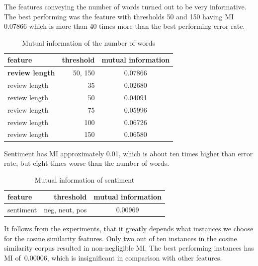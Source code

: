 The features conveying the number of words turned out to be very informative.
The best performing was the feature with thresholds 50 and 150 having MI 0.07866 which
is more than 40 times more than the best performing error rate.

\begin{table}[h!]

\centering
\begin{tabular}{lrS[table-format=3.2]}
\toprule
\textbf{feature} & \textbf{threshold} & \textbf{mutual information} \\
\midrule
\textbf{review length} & 50, 150 & 0.07866 \\
review length & 35 & 0.02680 \\
review length & 50 & 0.04091 \\
review length & 75 & 0.05996 \\
review length & 100 & 0.06726 \\
review length & 150 & 0.06580 \\

\bottomrule
\end{tabular}
\caption{Mutual information of the number of words}\label{tab:mi_words}
\end{table}

Sentiment has MI approximately 0.01, which is about ten times higher
than error rate, but eight times worse than the number of words.

\begin{table}[h!]
\centering
\begin{tabular}{lrS[table-format=3.2]}
\toprule
\textbf{feature} & \textbf{threshold} & \textbf{mutual information} \\
\midrule
sentiment & neg, neut, pos & 0.00969 \\
\bottomrule
\end{tabular}
\caption{Mutual information of sentiment}\label{tab:mi_sentiment}
\end{table}

It follows from the experiments, that it greatly depends what instances
we choose for the cosine similarity features.
Only two out of ten instances in the cosine similarity corpus resulted in
non-negligible MI.
The best performing instances has MI of~\num{0.00006}, which is insignificant
in comparison with other features.

